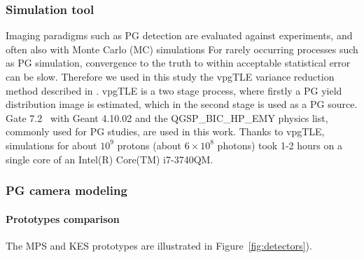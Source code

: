 \documentclass[a4paper,english,12pt]{article}
\begin{document}
\subsubsection{Simulation tool}\label{sec:SimTool}

Imaging paradigms such as PG detection are evaluated against experiments, and often also with Monte Carlo (MC) simulations %
For rarely occurring processes such as PG simulation, convergence to the truth to within acceptable statistical error can be slow. Therefore we used in this study the vpgTLE variance reduction method described in \cite{Huisman2016}. vpgTLE is a two stage process, where firstly a PG yield distribution image is estimated, which in the second stage is used as a PG source. Gate 7.2~\citep{Sarrut2014} with Geant 4.10.02 and the QGSP\_BIC\_HP\_EMY physics list, commonly used for PG studies, are used in this work. Thanks to vpgTLE, simulations for about $10^9$ protons (about $6\times10^8$ photons) took 1-2 hours on a single core of an Intel(R) Core(TM) i7-3740QM.

\subsubsection{PG camera modeling}\label{sec:camera}

\paragraph{Prototypes comparison}

The MPS and KES prototypes are illustrated in Figure~\ref{fig:detectors}).
\end{document}
